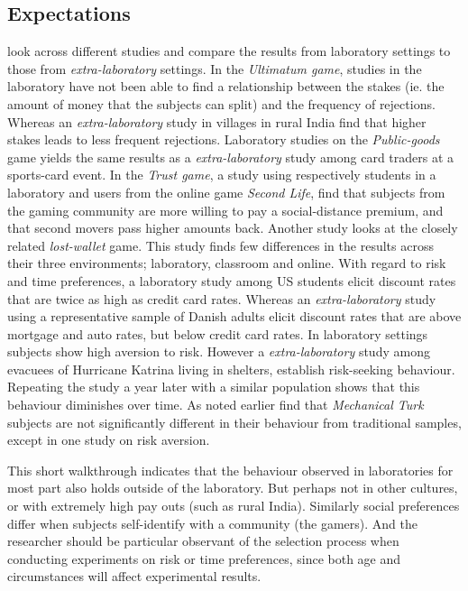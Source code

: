 \documentclass[preprint, 12pt]{elsarticle}
\begin{document}
\subsection{Expectations}

\cite{Charness_Gneezy_Kuhn_2013} look across different studies and compare the results from  laboratory settings to those from \emph{extra-laboratory} settings. In the \emph{Ultimatum game}, studies in the laboratory have not been able to find a relationship between the stakes (ie. the amount of money that the subjects can split) and the frequency of rejections. Whereas an \emph{extra-laboratory} study in villages in rural India find that higher stakes leads to less frequent rejections. Laboratory studies on the \emph{Public-goods} game yields the same results as a \emph{extra-laboratory} study among card traders at a sports-card event. In the \emph{Trust game}, a study using respectively students in a laboratory and users from the online game \emph{Second Life}, find that subjects from the gaming community are more willing to pay a social-distance premium, and that second movers pass higher amounts back. Another study looks at the closely related \emph{lost-wallet} game. This study finds few differences in the results across their three environments; laboratory, classroom and online. With regard to risk and time preferences, a laboratory study among US students elicit discount rates that are twice as high as credit card rates. Whereas an \emph{extra-laboratory} study using a representative sample of Danish adults elicit discount rates that are above mortgage and auto rates, but below credit card rates. In laboratory settings subjects show high aversion to risk. However a \emph{extra-laboratory} study among evacuees of Hurricane Katrina living in shelters, establish risk-seeking behaviour. Repeating the study a year later with a similar population shows that this behaviour diminishes over time. As noted earlier \cite{Goodman_Cryder_Cheema_2013} find that \emph{Mechanical Turk} subjects are not significantly different in their behaviour from traditional samples, except in one study on risk aversion.

This short walkthrough indicates that the behaviour observed in laboratories for most part also holds outside of the laboratory. But perhaps not in other cultures, or with extremely high pay outs (such as rural India). Similarly social preferences differ when subjects self-identify with a community (the gamers). And the researcher should be particular observant of the selection process when conducting experiments on risk or time preferences, since both age and circumstances will affect experimental results.
\end{document}
